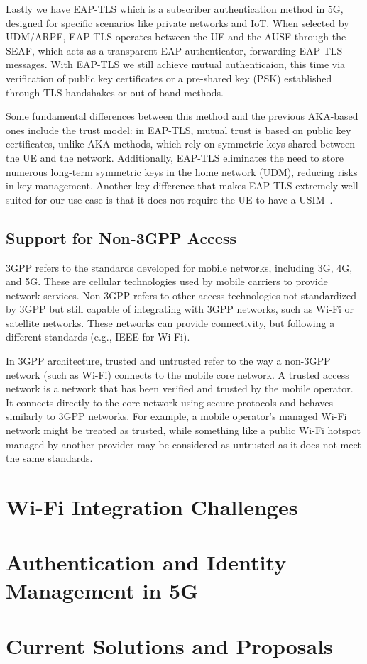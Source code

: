 Lastly we have \ac{EAP-TLS} which is a subscriber authentication method in \ac{5G}, designed for specific scenarios like private networks and \ac{IoT}. When selected by \ac{UDM}/\ac{ARPF}, \ac{EAP-TLS} operates between the \ac{UE} and the \ac{AUSF} through the \ac{SEAF}, which acts as a transparent \ac{EAP} authenticator, forwarding \ac{EAP-TLS} messages. With \ac{EAP-TLS} we still achieve mutual authenticaion, this time via verification of public key certificates or a pre-shared key (\ac{PSK}) established through \ac{TLS} handshakes or out-of-band methods.

Some fundamental differences between this method and the previous AKA-based ones include the trust model: in \ac{EAP-TLS}, mutual trust is based on public key certificates, unlike AKA methods, which rely on symmetric keys shared between the \ac{UE} and the network. Additionally, \ac{EAP-TLS} eliminates the need to store numerous long-term symmetric keys in the home network (\ac{UDM}), reducing risks in key management. Another key difference that makes \ac{EAP-TLS} extremely well-suited for our use case is that it does not require the \ac{UE} to have a \ac{USIM}~\cite{cbl-comp-4g-5g-p12}.

\subsection{Support for Non-\acs{3GPP} Access}

\ac{3GPP} refers to the standards developed for mobile networks, including \ac{3G}, \ac{4G}, and \ac{5G}. These are cellular technologies used by mobile carriers to provide network services. Non-\ac{3GPP} refers to other access technologies not standardized by \ac{3GPP} but still capable of integrating with \ac{3GPP} networks, such as Wi-Fi or satellite networks. These networks can provide connectivity, but following a different standards (e.g., IEEE for Wi-Fi).

In \ac{3GPP} architecture, trusted and untrusted refer to the way a non-\ac{3GPP} network (such as Wi-Fi) connects to the mobile core network. A trusted access network is a network that has been verified and trusted by the mobile operator. It connects directly to the core network using secure protocols and behaves similarly to \ac{3GPP} networks. For example, a mobile operator's managed Wi-Fi network might be treated as trusted, while something like a public Wi-Fi hotspot managed by another provider may be considered as untrusted as it does not meet the same standards.

\section{Wi-Fi Integration Challenges}

\section{Authentication and Identity Management in \acs{5G}}


\section{Current Solutions and Proposals}